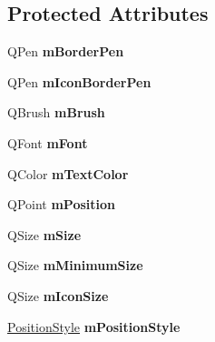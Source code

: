 \subsection*{Protected Attributes}
\begin{DoxyCompactItemize}
\item 
\hypertarget{classQCPLegend_a52ab8342a382456131d567f962d7f9d0}{Q\-Pen {\bfseries m\-Border\-Pen}}\label{classQCPLegend_a52ab8342a382456131d567f962d7f9d0}

\item 
\hypertarget{classQCPLegend_a773ae518c3149fcabff4a2906fdacbc4}{Q\-Pen {\bfseries m\-Icon\-Border\-Pen}}\label{classQCPLegend_a773ae518c3149fcabff4a2906fdacbc4}

\item 
\hypertarget{classQCPLegend_a9bd7cd05a9a485e06eda513a348baf80}{Q\-Brush {\bfseries m\-Brush}}\label{classQCPLegend_a9bd7cd05a9a485e06eda513a348baf80}

\item 
\hypertarget{classQCPLegend_a56ffacb184a99eefe09a0c7181d0713d}{Q\-Font {\bfseries m\-Font}}\label{classQCPLegend_a56ffacb184a99eefe09a0c7181d0713d}

\item 
\hypertarget{classQCPLegend_a478b2d809a7390e9ff8f8bb70d6bd9fe}{Q\-Color {\bfseries m\-Text\-Color}}\label{classQCPLegend_a478b2d809a7390e9ff8f8bb70d6bd9fe}

\item 
\hypertarget{classQCPLegend_a1a1033e581aba17a234a320b7fffc739}{Q\-Point {\bfseries m\-Position}}\label{classQCPLegend_a1a1033e581aba17a234a320b7fffc739}

\item 
\hypertarget{classQCPLegend_aa55b33bf64e26c76e6475fd3140af8a2}{Q\-Size {\bfseries m\-Size}}\label{classQCPLegend_aa55b33bf64e26c76e6475fd3140af8a2}

\item 
\hypertarget{classQCPLegend_a52f5ad2b7fe948e98286447165953c40}{Q\-Size {\bfseries m\-Minimum\-Size}}\label{classQCPLegend_a52f5ad2b7fe948e98286447165953c40}

\item 
\hypertarget{classQCPLegend_a39b972aae6c6a3fa5aa73313ab7a5765}{Q\-Size {\bfseries m\-Icon\-Size}}\label{classQCPLegend_a39b972aae6c6a3fa5aa73313ab7a5765}

\item 
\hypertarget{classQCPLegend_abd6cf2517b85e73c98b8f00c3a4104c0}{\hyperlink{classQCPLegend_aa61c3d82a6c7942dddefbf1ed1f7049f}{Position\-Style} {\bfseries m\-Position\-Style}}\label{classQCPLegend_abd6cf2517b85e73c98b8f00c3a4104c0}


\end{DoxyCompactItemize}

